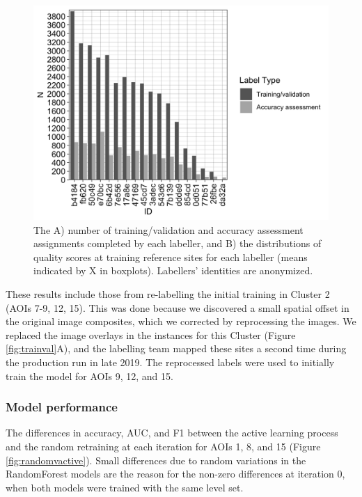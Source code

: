 \documentclass[
  11pt,
  a4paper]{article}
\begin{document}
\begin{figure}[!ht]

{\centering \includegraphics[width=0.8\linewidth,]{figures/si_training_n} 

}

\caption{The A) number of training/validation and accuracy assessment assignments completed by each labeller, and B) the distributions of quality scores at training reference sites for each labeller (means indicated by X in boxplots). Labellers' identities are anonymized.}\label{fig:assignmentcount}
\end{figure}

These results include those from re-labelling the initial training in
Cluster 2 (AOIs 7-9, 12, 15). This was done because we discovered a
small spatial offset in the original image composites, which we
corrected by reprocessing the images. We replaced the image overlays in
the instances for this Cluster (Figure \ref{fig:trainval}A), and the
labelling team mapped these sites a second time during the production
run in late 2019. The reprocessed labels were used to initially train
the model for AOIs 9, 12, and 15.

\hypertarget{model-performance}{%
\subsubsection{Model performance}\label{model-performance}}

The differences in accuracy, AUC, and F1 between the active learning
process and the random retraining at each iteration for AOIs 1, 8, and
15 (Figure \ref{fig:randomvactive}). Small differences due to random
variations in the RandomForest models are the reason for the non-zero
differences at iteration 0, when both models were trained with the same
level set.
\end{document}
